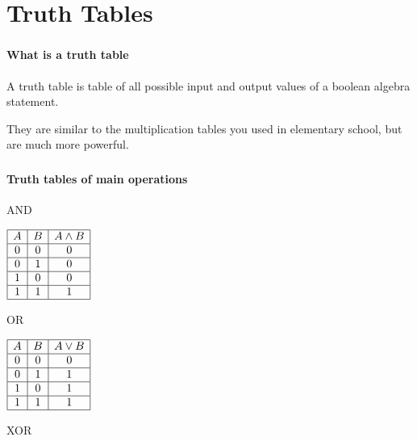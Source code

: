 \documentclass{beamer}
\newenvironment{namedframe}[1]%
	{\begin{frame}\frametitle{\secname}\framesubtitle{#1}}
	{\end{frame}}
\begin{document}
	\section{Truth Tables}
	\begin{namedframe}{What is a truth table}
		A truth table is table of all possible input and output values of a boolean algebra statement.
		\pause

		They are similar to the multiplication tables you used in elementary school, but are much more powerful.
	\end{namedframe}
	\begin{namedframe}{Truth tables of main operations}
		\begin{center}
			\begin{minipage}[t]{0.45\textwidth}
				\pause
				\begin{table}
					\caption{AND}
					\begin{math}
						\begin{array}{|c|c|c|}
							\hline
							A & B & A \wedge B\\\hline
							0 & 0 & 0\\\hline
							0 & 1 & 0\\\hline
							1 & 0 & 0\\\hline
							1 & 1 & 1\\\hline
						\end{array}
					\end{math}
				\end{table}
				\vspace{\baselineskip}
				\pause
				\begin{table}
					\caption{OR}
					\begin{math}
						\begin{array}{|c|c|c|}
							\hline
							A & B & A \vee B\\\hline
							0 & 0 & 0\\\hline
							0 & 1 & 1\\\hline
							1 & 0 & 1\\\hline
							1 & 1 & 1\\\hline
						\end{array}
					\end{math}
				\end{table}
			\end{minipage}
			\begin{minipage}[t]{0.45\textwidth}
				\pause
				\begin{table}
					\caption{XOR}
					\begin{math}

\end{math}
\end{table}
\end{minipage}
\end{center}
\end{namedframe}
\end{document}
